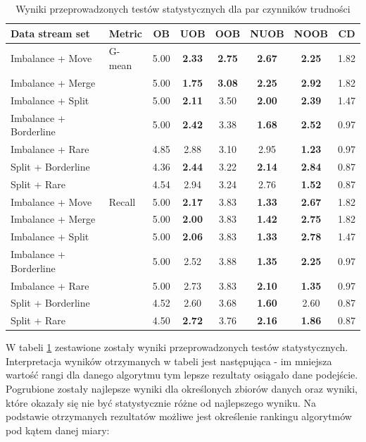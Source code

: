 \begin{table}[ht]
\centering\small%
\setlength{\tabcolsep}{10pt} 
\renewcommand{\arraystretch}{1.5} 
\begin{tabular}{l l c c c c c c}
\toprule
Data stream set & Metric & OB & UOB & OOB & NUOB & NOOB & CD \\
\midrule
Imbalance + Move & G-mean & 5.00 & \textbf{2.33} & \textbf{2.75} & \textbf{2.67} & \textbf{2.25} & 1.82 \\
Imbalance + Merge  & & 5.00 & \textbf{1.75} & \textbf{3.08} & \textbf{2.25} & \textbf{2.92} & 1.82 \\
Imbalance + Split  & & 5.00 & \textbf{2.11} & 3.50 & \textbf{2.00} & \textbf{2.39} & 1.47 \\
Imbalance + Borderline  & & 5.00 & \textbf{2.42} & 3.38 & \textbf{1.68} & \textbf{2.52} & 0.97 \\
Imbalance + Rare  & & 4.85 & 2.88 & 3.10 & 2.95 & \textbf{1.23} & 0.97 \\
Split + Borderline  & & 4.36 & \textbf{2.44} & 3.22 & \textbf{2.14} & \textbf{2.84} & 0.87 \\
Split + Rare  & & 4.54 & 2.94 & 3.24 & 2.76 & \textbf{1.52} & 0.87 \\
Imbalance + Move & Recall & 5.00 & \textbf{2.17} & 3.83 & \textbf{1.33} & \textbf{2.67} & 1.82 \\
Imbalance + Merge  & & 5.00 & \textbf{2.00} & 3.83 & \textbf{1.42} & \textbf{2.75} & 1.82 \\
Imbalance + Split  & & 5.00 & \textbf{2.06} & 3.83 & \textbf{1.33} & \textbf{2.78} & 1.47 \\
Imbalance + Borderline  & & 5.00 & 2.52 & 3.88 & \textbf{1.35} & \textbf{2.25} & 0.97 \\
Imbalance + Rare  & & 5.00 & 2.73 & 3.83 & \textbf{2.10} & \textbf{1.35} & 0.97 \\
Split + Borderline  & & 4.52 & 2.60 & 3.68 & \textbf{1.60} & 2.60 & 0.87 \\
Split + Rare  & & 4.50 & \textbf{2.72} & 3.76 & \textbf{2.16} & \textbf{1.86} & 0.87 \\
\bottomrule
\end{tabular}
\caption{Wyniki przeprowadzonych testów statystycznych dla par czynników trudności}\label{Tab:DoubleDriftFriedman}
\end{table}

\noindent W tabeli \ref{Tab:DoubleDriftFriedman} zestawione zostały wyniki przeprowadzonych testów statystycznych. Interpretacja wyników otrzymanych w tabeli jest następująca - im mniejsza wartość rangi dla danego algorytmu tym lepsze rezultaty osiągało dane podejście. Pogrubione zostały najlepsze wyniki dla określonych zbiorów danych oraz wyniki, które okazały się nie być statystycznie różne od najlepszego wyniku. Na podstawie otrzymanych rezultatów możliwe jest określenie rankingu algorytmów pod kątem danej miary:

